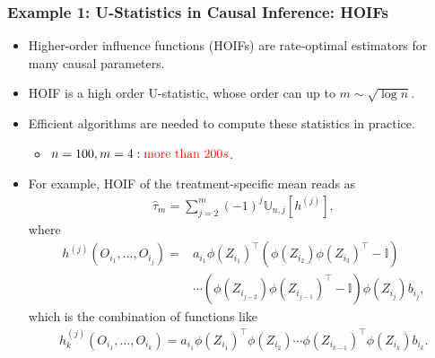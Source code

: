 \documentclass[9pt]{beamer}
\theoremstyle{mystyle}
\theoremstyle{mystyletwo}
\def\hat{\widehat}
\newcommand{\ustat}{\mathbb{U}}
\begin{document}
\begin{frame}
    \frametitle{Example 1: U-Statistics in Causal Inference: HOIFs}
    \begin{itemize}
        \item Higher-order influence functions (HOIFs) \citep{robins2008higher, robins2016technical} are rate-optimal estimators for many causal parameters. 
        \item HOIF is a high order U-statistic, whose order can up to $m \sim \sqrt{\log n}$.
        \item Efficient algorithms are needed to compute these statistics in practice.
        \begin{itemize}
            \item $n=100, m=4: {\color{red} \text{more than } 200s}$.
        \end{itemize}
        \item For example, HOIF of the treatment-specific mean reads as
              \begin{align*}
                  \hat{\tau}_{m} = \sum_{j = 2}^{m} (-1)^{j} \ustat_{n,j}[h^{(j)}],
              \end{align*}
              where
              \begin{align*}
                  h^{(j)}(O_{i_1}, \ldots, O_{i_j}) = & a_{i_{1}} \phi (Z_{i_{1}})^{\top} (\phi(Z_{i_2})\phi(Z_{i_3})^\top - \mathbb{I}) \\
                & \cdots (\phi(Z_{i_{j-2}})\phi(Z_{i_{j-1}})^\top - \mathbb{I}) \phi(Z_{i_j})b_{i_j}, 
              \end{align*}
              which is the combination of functions like
              \begin{align*}
                  h^{(j)}_k(O_{i_1}, \ldots, O_{i_k}) = a_{i_{1}} \phi (Z_{i_{1}})^{\top} \phi(Z_{i_2}) \cdots \phi(Z_{i_{k-1}})^\top \phi(Z_{i_k})b_{i_k}. 
              \end{align*}
    \end{itemize}
\end{frame}
\end{document}
